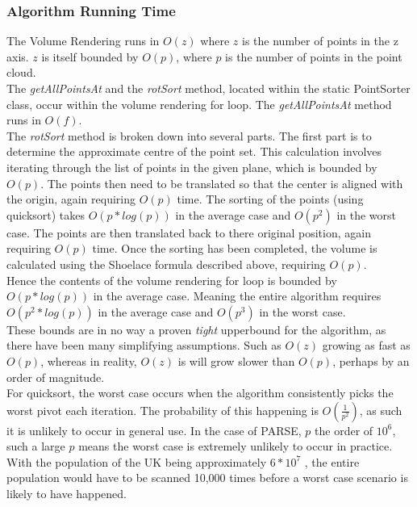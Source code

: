\subsubsection{Algorithm Running Time}
The Volume Rendering runs in $O(z)$ where $z$ is the number of points in the z axis. 
$z$ is itself bounded by $O(p)$, where $p$ is the number of points in the point cloud. \\

The \textit{getAllPointsAt} and the \textit{rotSort} method, located within the static PointSorter class, occur within the volume rendering for loop. 
The  \textit{getAllPointsAt} method runs in  $O(f)$.\\

The \textit{rotSort} method is broken down into several parts. 
The first part is to determine the approximate centre of the point set. 
This calculation involves iterating through the list of points in the given plane, which is bounded by $O(p)$. 
The points then need to be translated so that the center is aligned with the origin, again requiring $O(p)$ time. 
The sorting of the points (using quicksort) takes $O(p * log(p))$ in the average case and $O(p^2)$ in the worst case. 
The points are then translated back to there original position, again requiring $O(p)$ time. 
Once the sorting has been completed, the volume is calculated using the Shoelace formula described above, requiring $O(p)$.\\

Hence the contents of the volume rendering for loop is bounded by $O(p * log(p))$ in the average case. 
Meaning the entire algorithm requires $O(p^2 * log(p))$ in the average case and $O(p^3)$ in the worst case. \\

These bounds are in no way a proven \textit{tight} upperbound for the algorithm, as there have been many simplifying assumptions. 
Such as $O(z)$ growing as fast as $O(p)$, whereas in reality, $O(z)$ is will grow slower than $O(p)$, perhaps by an order of magnitude.\\

For quicksort, the worst case occurs when the algorithm consistently picks the worst pivot each iteration. 
The probability of this happening is $O(\frac{1}{p^2})$, as such it is unlikely to occur in general use. 
In the case of PARSE, $p$ the order of $10^6$, such a large $p$ means the worst case is extremely unlikely to occur in practice. With the population of the UK being approximately $6 * 10^7$ \cite{UnitedKingdomofGreatBritain2011}, the entire population would have to be scanned 10,000 times before a worst case scenario is likely to have happened.